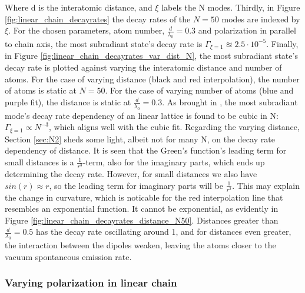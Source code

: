 \documentclass{article}
\begin{document}
Where d is the interatomic distance, and $\xi$ labels the N modes. Thirdly, in Figure \ref{fig:linear_chain_decayrates} the decay rates of the $N=50$ modes are indexed by $\xi$. For the chosen parameters, atom number, $\frac{d}{\lambda_0}=0.3$ and polarization in parallel to chain axis, the most subradiant state's decay rate is $\Gamma_{\xi=1} \approxeq 2.5 \cdot 10^{-5}$. Finally, in Figure \ref{fig:linear_chain_decayrates_var_dist_N}, the most subradiant state's decay rate is plotted against varying the interatomic distance and number of atoms. For the case of varying distance (black and red interpolation), the number of atoms is static at $N=50$. For the case of varying number of atoms (blue and purple fit), the distance is static at $\frac{d}{\lambda_0} = 0.3$. As brought in \cite{ZhangMolmer}, the most subradiant mode's decay rate dependency of an linear lattice is found to be cubic in N: $\Gamma_{\xi=1} \propto N^{-3}$, which aligns well with the cubic fit. Regarding the varying distance, Section \ref{sec:N2} sheds some light, albeit not for many N, on the decay rate dependency of distance. It is seen that the Green's function's leading term for small distances is a $\frac{1}{r^3}$-term, also for the imaginary parts, which ends up determining the decay rate. However, for small distances we also have $sin(r) \approx r$, so the leading term for imaginary parts will be $\frac{1}{r^2}$. This may explain the change in curvature, which is noticable for the red interpolation line that resembles an exponential function. It cannot be exponential, as evidently in Figure \ref{fig:linear_chain_decayrates_distance_N50}. Distances greater than $\frac{d}{\lambda_0} = 0.5$ has the decay rate oscillating around 1, and for distances even greater, the interaction between the dipoles weaken, leaving the atoms closer to the vacuum spontaneous emission rate. 

\subsubsection{Varying polarization in linear chain}\label{disc:linear_chain_varypola}
\end{document}
